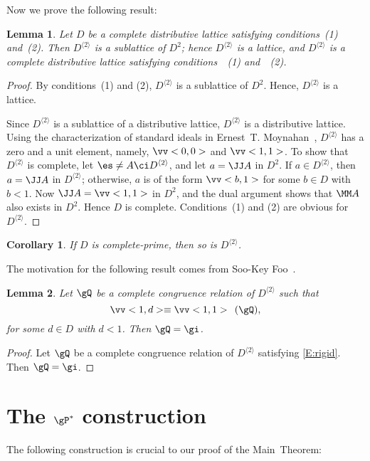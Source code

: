 \documentclass{amsart}
\theoremstyle{plain}
\newtheorem{corollary}{Corollary}
\newtheorem{lemma}{Lemma}
\theoremstyle{definition}
\theoremstyle{remark}
\numberwithin{equation}{section}
\newcommand{\Ds}{D^{\langle2\rangle}}
\begin{document}
Now we prove the following result:

\begin{lemma}\label{L:ds} 
   Let $D$ be a complete distributive lattice satisfying 
   conditions~\textup{(1)} and~\textup{(2)}.  
   Then $\Ds$ is a sublattice of $D^{2}$; hence $\Ds$ is
   a lattice, and $\Ds$ is a complete distributive lattice 
   satisfying conditions~~\textup{(1)} and~~\textup{(2)}.  
\end{lemma}

\begin{proof}
   By conditions~(1) and (2), $\Ds$ is a sublattice of 
   $D^{2}$.  Hence, $\Ds$ is a lattice.

   Since $\Ds$ is a sublattice of a distributive lattice, $\Ds$ is 
   a distributive lattice.  Using the characterization of
   standard ideals in Ernest~T. Moynahan~\cite{eM57}, 
   $\Ds$ has a zero and a unit element, namely, 
   $\vv<0, 0>$ and $\vv<1, 1>$.  To show that $\Ds$ is
   complete, let $\es \ne A \ci \Ds$, and let $a = \JJ A$
   in $D^{2}$.  If $a \in \Ds$, then 
   $a = \JJ A$ in $\Ds$; otherwise, $a$ is of the form 
   $\vv<b, 1>$ for some $b \in D$ with $b < 1$.  Now 
   $\JJ A = \vv<1, 1>$ in $D^{2}$, and   
   the dual argument shows that $\MM A$ also exists in 
   $D^{2}$.  Hence $D$ is complete. Conditions~(1) and (2)
   are obvious for $\Ds$.   
\end{proof}

\begin{corollary}\label{C:prime}
   If $D$ is complete-prime, then so is $\Ds$.
\end{corollary}

The motivation for the following result comes from Soo-Key 
Foo~\cite{sF90}.

\begin{lemma}\label{L:ccr} 
   Let $\gQ$ be a complete congruence relation of $\Ds$ such 
   that
   \begin{equation}\label{E:rigid}
      \vv<1, d> \equiv \vv<1, 1> \pod{\gQ},
   \end{equation}
   for some $d \in D$ with $d < 1$. Then $\gQ = \gi$.
\end{lemma}

\begin{proof}
   Let $\gQ$ be a complete congruence relation of $\Ds$ 
   satisfying \eqref{E:rigid}. Then $\gQ = \gi$.
\end{proof}

\section{The $\gP^{*}$ construction}\label{S:P*} 
The following construction is crucial to our proof of the 
Main~Theorem:
\end{document}
